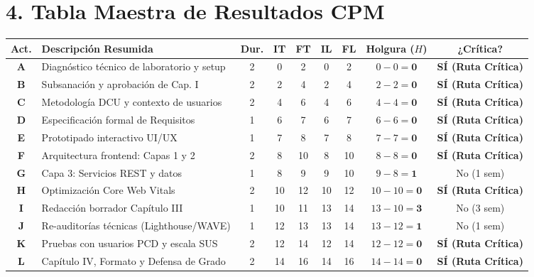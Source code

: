 \documentclass[11pt,a4paper]{article}
\begin{document}
\section*{\normalsize\color{utiNavy}4. Tabla Maestra de Resultados CPM}

\begin{center}
\small
\begin{tabularx}{\textwidth}{c X c c c c c c c}
\toprule
\textbf{Act.} & \textbf{Descripción Resumida} & \textbf{Dur.} & \textbf{IT} & \textbf{FT} & \textbf{IL} & \textbf{FL} & \textbf{Holgura ($H$)} & \textbf{¿Crítica?} \\
\midrule
\textbf{A} & Diagnóstico técnico de laboratorio y setup & 2 & 0 & 2 & 0 & 2 & $0 - 0 = \mathbf{0}$ & \textbf{\color{criticalRed}SÍ (Ruta Crítica)} \\
\textbf{B} & Subsanación y aprobación de Cap. I & 2 & 2 & 4 & 2 & 4 & $2 - 2 = \mathbf{0}$ & \textbf{\color{criticalRed}SÍ (Ruta Crítica)} \\
\textbf{C} & Metodología DCU y contexto de usuarios & 2 & 4 & 6 & 4 & 6 & $4 - 4 = \mathbf{0}$ & \textbf{\color{criticalRed}SÍ (Ruta Crítica)} \\
\textbf{D} & Especificación formal de Requisitos & 1 & 6 & 7 & 6 & 7 & $6 - 6 = \mathbf{0}$ & \textbf{\color{criticalRed}SÍ (Ruta Crítica)} \\
\textbf{E} & Prototipado interactivo UI/UX & 1 & 7 & 8 & 7 & 8 & $7 - 7 = \mathbf{0}$ & \textbf{\color{criticalRed}SÍ (Ruta Crítica)} \\
\textbf{F} & Arquitectura frontend: Capas 1 y 2 & 2 & 8 & 10 & 8 & 10 & $8 - 8 = \mathbf{0}$ & \textbf{\color{criticalRed}SÍ (Ruta Crítica)} \\
\textbf{G} & Capa 3: Servicios REST y datos & 1 & 8 & 9 & 9 & 10 & $9 - 8 = \mathbf{1}$ & \color{slackGreen}No (1 sem) \\
\textbf{H} & Optimización Core Web Vitals & 2 & 10 & 12 & 10 & 12 & $10 - 10 = \mathbf{0}$ & \textbf{\color{criticalRed}SÍ (Ruta Crítica)} \\
\textbf{I} & Redacción borrador Capítulo III & 1 & 10 & 11 & 13 & 14 & $13 - 10 = \mathbf{3}$ & \color{slackGreen}No (3 sem) \\
\textbf{J} & Re-auditorías técnicas (Lighthouse/WAVE) & 1 & 12 & 13 & 13 & 14 & $13 - 12 = \mathbf{1}$ & \color{slackGreen}No (1 sem) \\
\textbf{K} & Pruebas con usuarios PCD y escala SUS & 2 & 12 & 14 & 12 & 14 & $12 - 12 = \mathbf{0}$ & \textbf{\color{criticalRed}SÍ (Ruta Crítica)} \\
\textbf{L} & Capítulo IV, Formato y Defensa de Grado & 2 & 14 & 16 & 14 & 16 & $14 - 14 = \mathbf{0}$ & \textbf{\color{criticalRed}SÍ (Ruta Crítica)} \\
\bottomrule
\end{tabularx}
\end{center}
\end{document}
